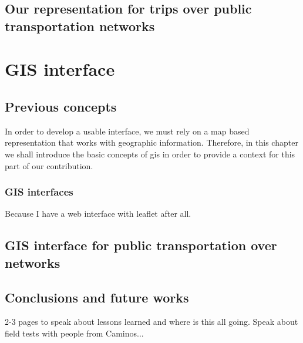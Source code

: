 \documentclass[a4paper,10pt,twoside]{book}
\begin{document}

	
\chapter{Our representation for trips over public transportation networks}
\label{sec:newctr}

	
\part{GIS interface}
\chapter{Previous concepts}
    In order to develop a usable interface, we must rely on a map based representation that works with geographic information. Therefore, in this chapter we shall introduce the basic concepts of \gls{gis} in order to provide a context for this part of our contribution.

    \section{GIS interfaces}
	Because I have a web interface with leaflet after all.

\chapter{GIS interface for public transportation over networks}

	
\chapter{ Conclusions and future works}
	2-3 pages to speak about lessons learned and where is this all going. Speak about field tests with people from Caminos...

% 



\vfill \pagebreak \thispagestyle{empty} \mbox{}
\vfill \pagebreak \mbox{} \thispagestyle{empty}
\end{document}
